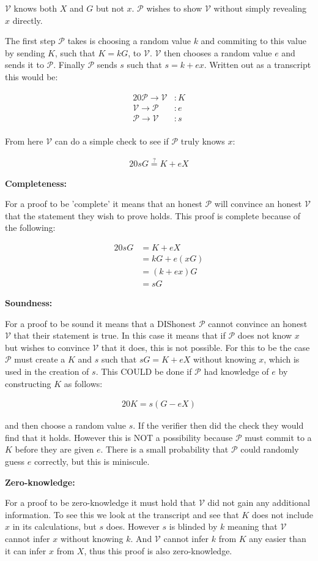 \documentclass{article}
\newcommand{\eq}[1]{\begin{alignat*}{20}#1\end{alignat*}}
\newcommand{\V}{\mathcal{V}}
\renewcommand{\P}{\mathcal{P}}
\begin{document}
$\V$ knows both $X$ and $G$ but not $x$. $\P$ wishes to show $\V$ without simply revealing $x$ directly. 

The first step $\P$ takes is choosing a random value $k$ and commiting to this value by sending $K$, such that $K = kG$, to $\V$. $\V$ then chooses a random value $e$ and sends it to $\P$. Finally $\P$ sends $s$ such that $s = k + ex$. Written out as a transcript this would be:

\eq{
	\P \rightarrow \V &: K \\
	\V \rightarrow \P &: e \\
	\P \rightarrow \V &: s \\
}

From here $\V$ can do a simple check to see if $\P$ truly knows $x$:

\eq{
	sG \stackrel{?}{=} K + eX
}


\textbf{Completeness:}

For a proof to be 'complete' it means that an honest $\P$ will convince an honest $\V$ that the statement they wish to prove holds. This proof is complete because of the following:

\eq{
	sG &= K + eX \\
	&= kG + e(xG) \\
	&= (k + ex)G \\
	&= sG
}

\textbf{Soundness:}

For a proof to be sound it means that a DIShonest $\P$ cannot convince an honest $\V$ that their statement is true. In this case it means that if $\P$ does not know $x$ but wishes to convince $\V$ that it does, this is not possible. For this to be the case $\P$ must create a $K$ and $s$ such that $sG = K + eX$ without knowing $x$, which is used in the creation of $s$. This COULD be done if $\P$ had knowledge of $e$ by constructing $K$ as follows: 

\eq{
	K = s(G - eX)
}

and then choose a random value $s$. If the verifier then did the check they would find that it holds. However this is NOT a possibility because $\P$ must commit to a $K$ before they are given $e$. There is a small probability that $\P$ could randomly guess $e$ correctly, but this is miniscule.

\textbf{Zero-knowledge:}

For a proof to be zero-knowledge it must hold that $\V$ did not gain any additional information. To see this we look at the transcript and see that $K$ does not include $x$ in its calculations, but $s$ does. However $s$ is blinded by $k$ meaning that $\V$ cannot infer $x$ without knowing $k$. And $\V$ cannot infer $k$ from $K$ any easier than it can infer $x$ from $X$, thus this proof is also zero-knowledge. 
\end{document}
